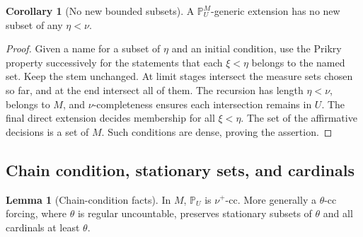 \documentclass[11pt,letterpaper]{article}
\theoremstyle{definition}
\newtheorem{lemma}[definition]{Lemma}
\newtheorem{corollary}[definition]{Corollary}
\numberwithin{equation}{section}
\newcommand{\PP}{\mathbb P}
\begin{document}
\begin{corollary}[No new bounded subsets]\label{cor:nobounded}
A $\PP_U^M$-generic extension has no new subset of any $\eta<\nu$.
\end{corollary}

\begin{proof}
Given a name for a subset of $\eta$ and an initial condition, use the
Prikry property successively for the statements that each
$\xi<\eta$ belongs to the named set. Keep the stem unchanged.
At limit stages intersect the measure sets chosen so far, and at
the end intersect all of them. The recursion has length
$\eta<\nu$, belongs to $M$, and $\nu$-completeness ensures each
intersection remains in $U$. The final direct extension decides
membership for all $\xi<\eta$. The set of the affirmative decisions
is a set of $M$. Such conditions are dense, proving the assertion.
\end{proof}

\subsection{Chain condition, stationary sets, and cardinals}

\begin{lemma}[Chain-condition facts]\label{lem:cc}
In $M$, $\PP_U$ is $\nu^+$-cc. More generally a $\theta$-cc forcing,
where $\theta$ is regular uncountable, preserves stationary subsets
of $\theta$ and all cardinals at least $\theta$.
\end{lemma}
\end{document}
